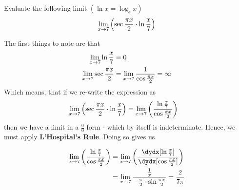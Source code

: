 


\POWER{}\p

\question[4] Evaluate the following limit $(\ln x = \log_{e}x )$ \[ \lim_{x\to7}\left( \sec\frac{\pi x}{2}\cdot\ln\frac{x}{7}\right) \] 

\watchout

\begin{solution}[\halfpage]
  The first things to note are that 
  \begin{align}
    \lim_{x\to7}\ln\frac{x}{7} &= 0 \\
    \lim_{x\to7}\sec\frac{\pi x}{2} &= \lim_{x\to7}\dfrac{1}{\cos\frac{\pi x}{2}} = \infty
  \end{align}
  Which means, that if we re-write the expression as 
  \begin{align}
    \lim_{x\to7}\left( \sec\frac{\pi x}{2}\cdot\ln\frac{x}{7} \right) &= 
    \lim_{x\to7}\left( \dfrac{\ln\frac{x}{7}}{\cos\frac{\pi x}{2}} \right)
  \end{align}
  then we have a limit in a $\frac{0}{0}$ form - which by itself is indeterminate. Hence, we must 
  apply \textbf{L'Hospital's Rule}. Doing so gives us 

  \begin{align}
    \lim_{x\to\vbone}\left( \dfrac{\ln\frac{x}\vbone}{\cos\frac{\pi x}{2}} \right) &=
    \lim_{x\to\vbone}\left( \dfrac{\dydx[\ln\frac{x}\vbone]}{\dydx[\cos\frac{\pi x}{2}]} \right) \\
    &= \lim_{x\to\vbone}\dfrac{\frac{1}{x}}{-\frac\pi{2}\cdot\sin\frac{\pi x}{2}} = \vbtwo
  \end{align}
\end{solution}

